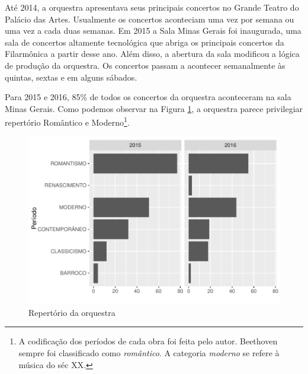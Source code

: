 \documentclass[a4paper, 12pt, openright, oneside, german, french, english, brazil]{abntex2}
\begin{document}
	Até 2014, a orquestra apresentava seus principais concertos no Grande Teatro do Palácio das Artes. Usualmente os concertos aconteciam uma vez por semana ou uma vez a cada duas semanas. Em 2015 a Sala Minas Gerais foi inaugurada, uma sala de concertos altamente tecnológica que abriga os principais concertos da Filarmônica a partir desse ano. Além disso, a abertura da sala modificou a lógica de produção da orquestra. Os concertos passam a acontecer semanalmente às quintas, sextas e em alguns sábados.
		
	
	
	Para 2015 e 2016, 85\% de todos os concertos da orquestra aconteceram na sala Minas Gerais. Como podemos observar na Figura \ref{repertoire-peryear}, a orquestra parece privilegiar repertório Romântico e Moderno\footnote{A codificação dos períodos de cada obra foi feita pelo autor. Beethoven sempre foi classificado como \textit{romântico}. A categoria \textit{moderno} se refere à música do séc XX.}.
	
	\begin{figure}[!h]
		\centering
		\caption{Repertório da orquestra}
		\label{repertoire-peryear}
		\includegraphics[scale=0.7]{periodo_peryear.pdf}
	\end{figure}
	
\end{document}
